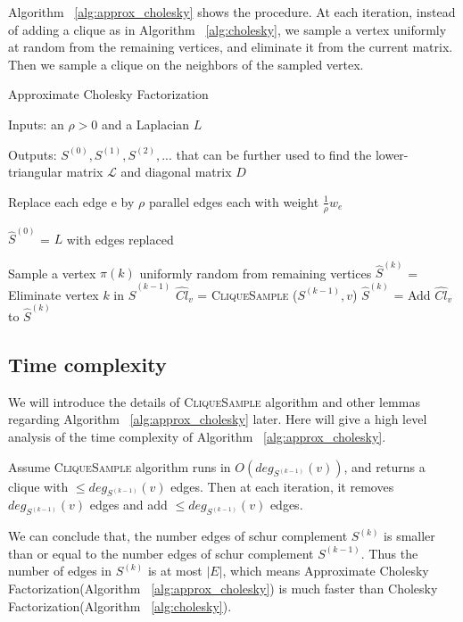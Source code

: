 \documentclass[11pt]{article}
\newcommand{\csamp}{\textsc{CliqueSample }}
\begin{document}
Algorithm ~\ref{alg:approx_cholesky} shows the procedure. At each iteration, instead of adding a clique as in Algorithm ~\ref{alg:cholesky}, we sample a vertex uniformly at random from the remaining vertices, and eliminate it from the current matrix. Then we sample a clique on the neighbors of the sampled vertex.

\begin{algorithm}
  \caption {Approximate Cholesky Factorization}
  \label{alg:approx_cholesky}
  Inputs: an $\rho > 0$ and a Laplacian $L$ 
  
  Outputs: $S^{(0)}, S^{(1)}, S^{(2)}, ...$ that can be further used to find the lower-triangular matrix $\mathcal{L}$ and diagonal matrix $D$
  \begin{algorithmic}[0]
  \item Replace each edge e by $\rho$ parallel edges each with weight $\frac {1}{\rho} w_e$ 
  
  \State $\widehat{S}^{(0)}$ = $L$ with edges replaced

  \State Sample a vertex $\pi (k)$ uniformly random from remaining vertices
  \State $\widehat{S}^{(k)}$ = Eliminate vertex $k$  in $\widehat{S}^{(k-1)}$
  \State $\widehat{Cl}_v$ = \csamp($S^{(k - 1)}, v$)
  \State $\widehat{S}^{(k)}$ = Add $\widehat{Cl}_v$ to $\widehat{S}^{(k)}$
  \EndFor
  \end{algorithmic}
\end{algorithm}

\subsection{Time complexity}
We will introduce the details of \csamp algorithm and other lemmas regarding Algorithm ~\ref{alg:approx_cholesky} later. Here will give a high level analysis of the time complexity of Algorithm ~\ref{alg:approx_cholesky}. 

Assume \csamp algorithm runs in $O(deg_{S^{(k-1)}}(v))$, and returns a clique with $\leq deg_{S^{(k-1)}}(v)$ edges. Then at each iteration, it removes $deg_{S^{(k-1)}}(v)$ edges and add $\leq deg_{S^{(k-1)}}(v)$ edges. 

We can conclude that, the number edges of schur complement $S^{(k)}$ is smaller than or equal to the number edges of schur complement $S^{(k-1)}$. Thus the number of edges in $S^{(k)}$ is at most $|E|$, which means Approximate Cholesky Factorization(Algorithm ~\ref{alg:approx_cholesky}) is much faster than Cholesky Factorization(Algorithm ~\ref{alg:cholesky}).
\end{document}
